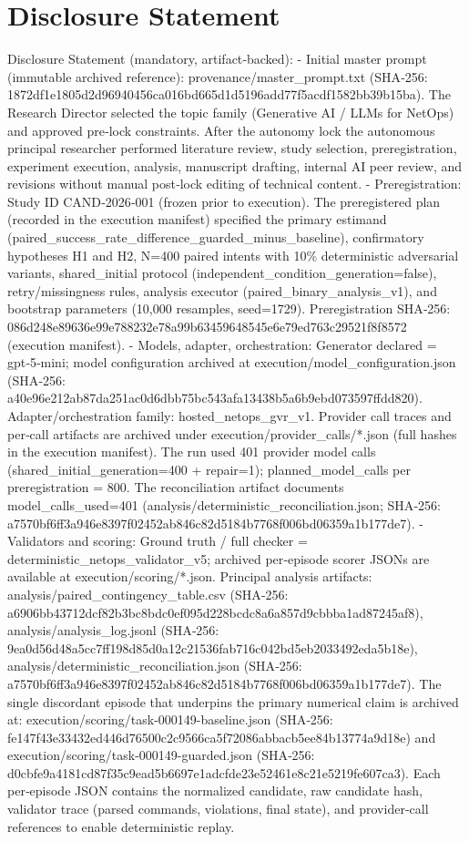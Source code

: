 \documentclass[conference]{IEEEtran}
\begin{document}
\section*{Disclosure Statement}
Disclosure Statement (mandatory, artifact‑backed):
- Initial master prompt (immutable archived reference): provenance/master\_prompt.txt (SHA‑256: 1872df1e1805d2d96940456ca016bd665d1d5196add77f5acdf1582bb39b15ba). The Research Director selected the topic family (Generative AI / LLMs for NetOps) and approved pre‑lock constraints. After the autonomy lock the autonomous principal researcher performed literature review, study selection, preregistration, experiment execution, analysis, manuscript drafting, internal AI peer review, and revisions without manual post‑lock editing of technical content.
- Preregistration: Study ID CAND‑2026‑001 (frozen prior to execution). The preregistered plan (recorded in the execution manifest) specified the primary estimand (paired\_success\_rate\_difference\_guarded\_minus\_baseline), confirmatory hypotheses H1 and H2, N=400 paired intents with 10\% deterministic adversarial variants, shared\_initial protocol (independent\_condition\_generation=false), retry/missingness rules, analysis executor (paired\_binary\_analysis\_v1), and bootstrap parameters (10,000 resamples, seed=1729). Preregistration SHA‑256: 086d248e89636e99e788232e78a99b63459648545e6e79ed763c29521f8f8572 (execution manifest).
- Models, adapter, orchestration: Generator declared = gpt‑5‑mini; model configuration archived at execution/model\_configuration.json (SHA‑256: a40e96e212ab87da251ac0d6dbb75bc543afa13438b5a6b9ebd073597ffdd820). Adapter/orchestration family: hosted\_netops\_gvr\_v1. Provider call traces and per‑call artifacts are archived under execution/provider\_calls/*.json (full hashes in the execution manifest). The run used 401 provider model calls (shared\_initial\_generation=400 + repair=1); planned\_model\_calls per preregistration = 800. The reconciliation artifact documents model\_calls\_used=401 (analysis/deterministic\_reconciliation.json; SHA‑256: a7570bf6ff3a946e8397f02452ab846c82d5184b7768f006bd06359a1b177de7).
- Validators and scoring: Ground truth / full checker = deterministic\_netops\_validator\_v5; archived per‑episode scorer JSONs are available at execution/scoring/*.json. Principal analysis artifacts: analysis/paired\_contingency\_table.csv (SHA‑256: a6906bb43712dcf82b3bc8bdc0ef095d228bcdc8a6a857d9cbbba1ad87245af8), analysis/analysis\_log.jsonl (SHA‑256: 9ea0d56d48a5cc7ff198d85d0a12c21536fab716c042bd5eb2033492eda5b18e), analysis/deterministic\_reconciliation.json (SHA‑256: a7570bf6ff3a946e8397f02452ab846c82d5184b7768f006bd06359a1b177de7). The single discordant episode that underpins the primary numerical claim is archived at: execution/scoring/task-000149-baseline.json (SHA‑256: fe147f43e33432ed446d76500c2c9566ca5f72086abbacb5ee84b13774a9d18e) and execution/scoring/task-000149-guarded.json (SHA‑256: d0cbfe9a4181cd87f35c9ead5b6697e1adcfde23e52461e8c21e5219fe607ca3). Each per‑episode JSON contains the normalized candidate, raw candidate hash, validator trace (parsed commands, violations, final state), and provider‑call references to enable deterministic replay.
\end{document}
